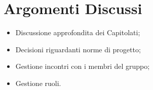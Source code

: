 \section{Argomenti Discussi}
	\begin{itemize}
		\item Discussione approfondita dei Capitolati\glos;
		\item Decisioni riguardanti norme di progetto;
		\item Gestione incontri con i membri del gruppo;
		\item Gestione ruoli.
	\end{itemize}